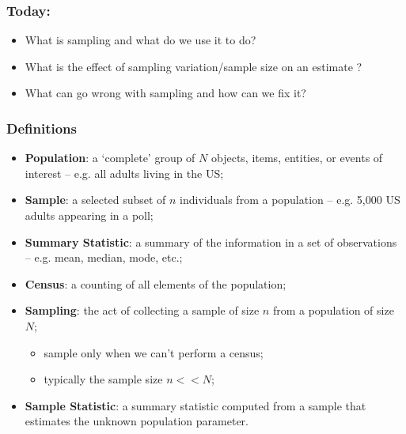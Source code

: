 \documentclass[aspectratio=169]{beamer}
\theoremstyle{principle}
\begin{document}
\begin{frame}
\frametitle{Today:}

\begin{itemize}
\item What is sampling and what do we use it to do?
\bigskip
\bigskip
\bigskip
\item What is the effect of sampling variation/sample size on an estimate ?
\bigskip
\bigskip
\bigskip
\item What can go wrong with sampling and how can we fix it?

\end{itemize}

\end{frame}

\begin{frame}
\frametitle{Definitions}
\begin{itemize}
\item \textbf{Population}: a `complete' group of $N$ objects, items, entities, or events of interest -- e.g. all adults living in the US;
\bigskip
\item \textbf{Sample}: a selected subset of $n$ individuals from a population -- e.g. 5,000 US adults appearing in a poll;
\bigskip
\item \textbf{Summary Statistic}: a summary of the information in a set of observations -- e.g. mean, median, mode, etc.;
\bigskip
\item[]\color{white} \textbf{Census}: a counting of all elements of the population;
\bigskip
\item[]\color{white} \textbf{Sampling}: the act of collecting a sample of size $n$ from a population of size $N$;
\begin{itemize} 
\item[]\color{white} sample only when we can’t perform a census;
\item[]\color{white} typically the sample size $n<<N$;
\end{itemize}
\bigskip
\item[]\color{white} \textbf{Sample Statistic}: a summary statistic computed from a sample that estimates the unknown population parameter.
\end{itemize}
\end{frame}
\end{document}
